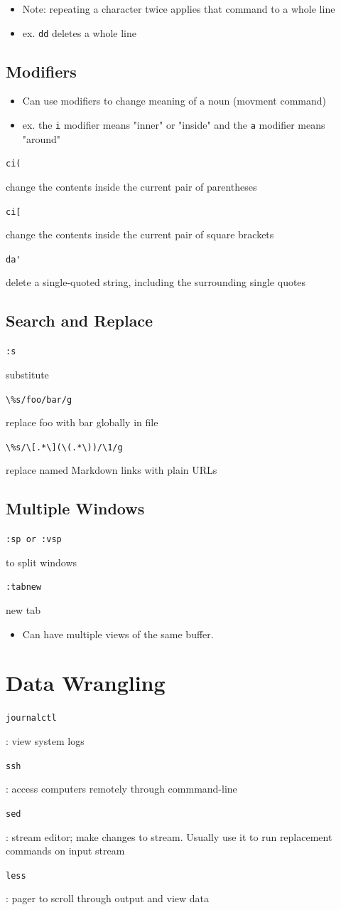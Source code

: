 \documentclass[letterpaper,12pt]{article}
\newcommand*{\lstitem}[1]{
  \setbox0\hbox{\lstinline{#1}}
  \item[\usebox0]
}
\begin{document}
\begin{itemize}
 \item Note: repeating a character twice applies that command to a whole line
 \item ex. \lstinline{dd} deletes a whole line
\end{itemize}

\subsection{Modifiers}
\begin{itemize}
 \item Can use modifiers to change meaning of a noun (movment command)
 \item ex. the \lstinline{i} modifier means "inner" or "inside" and the \lstinline{a} modifier means "around"
\end{itemize}

\begin{description}
 \lstitem{ci(} change the contents inside the current pair of parentheses
 \lstitem{ci[} change the contents inside the current pair of square brackets
 \lstitem{da'} delete a single-quoted string, including the surrounding single quotes
\end{description}

\subsection{Search and Replace}
\begin{description}
 \lstitem{:s} substitute
 \lstitem{\%s/foo/bar/g} replace foo with bar globally in file
 \lstitem{\%s/\[.*\](\(.*\))/\1/g} replace named Markdown links with plain URLs
\end{description}

\subsection{Multiple Windows}
\begin{description}
 \lstitem{:sp or :vsp} to split windows
 \lstitem{:tabnew} new tab
\end{description}

\begin{itemize}
 \item Can have multiple views of the same buffer.
\end{itemize}

\section{Data Wrangling}
\begin{description}
 \lstitem{journalctl}: view system logs
 \lstitem{ssh}: access computers remotely through commmand-line
 \lstitem{sed}: stream editor; make changes to stream. Usually use it to run  replacement commands on input stream
 \lstitem{less}: pager to scroll through output and view data
\end{description}
\end{document}
